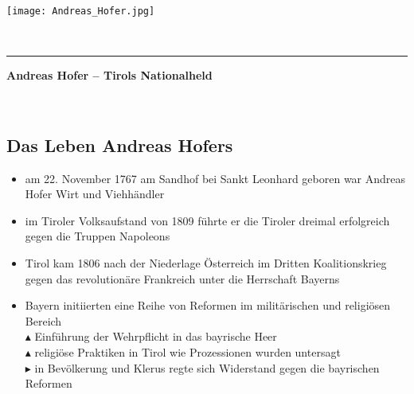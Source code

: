 \documentclass[11pt,a4paper]{article}
\begin{document}
\sffamily   %
\hfill%
\begin{minipage}[t]{.6\textwidth}
\raggedleft%
\texttt{[image: Andreas\_Hofer.jpg]}

\end{minipage}\\[0.5em]
%
{\color{firstnamecolor}\rule{\textwidth}{.25ex}}
%
\begin{minipage}[t]{.4\textwidth}
	\raggedright%
	\vspace*{1em}
	\textbf{\color{bluecolor} {\Large Andreas Hofer -- Tirols Nationalheld}} \\
	\small%

\end{minipage}
%
\hfill
%
\begin{minipage}[t]{.4\textwidth}
	\raggedleft %
\end{minipage}\\[2.2em]



\subsection*{\color{purplecolor} Das Leben Andreas Hofers}


\begin{itemize}

\item am 22. November 1767 am Sandhof bei Sankt Leonhard geboren war Andreas Hofer Wirt und Viehhändler

\item im Tiroler Volksaufstand von 1809 führte er die Tiroler dreimal erfolgreich gegen die Truppen Napoleons 

\item Tirol kam 1806 nach der Niederlage Österreich im Dritten Koalitionskrieg gegen das revolutionäre Frankreich unter die Herrschaft Bayerns

\item Bayern initiierten eine Reihe von Reformen im militärischen und religiösen Bereich\\
	$\blacktriangle$ Einführung der Wehrpflicht in das bayrische Heer\\
	$\blacktriangle$ religiöse Praktiken in Tirol wie Prozessionen wurden untersagt\\
	$\blacktriangleright$ in Bevölkerung und Klerus regte sich Widerstand gegen die bayrischen Reformen

\end{itemize}
\end{document}
